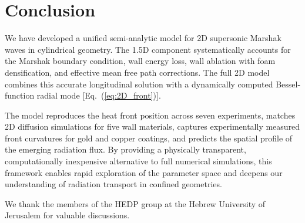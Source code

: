 \documentclass[prl, twocolumn, superscriptaddress, amsmath, amssymb, reprint]{revtex4-2}
\begin{document}
\section{Conclusion}

We have developed a unified semi-analytic model for 2D supersonic Marshak waves in cylindrical geometry.
The 1.5D component systematically accounts for the Marshak boundary condition, wall energy loss, wall ablation with foam densification, and effective mean free path corrections.
The full 2D model combines this accurate longitudinal solution with a dynamically computed Bessel-function radial mode [Eq.~(\ref{eq:2D_front})].

The model reproduces the heat front position across seven experiments, matches 2D diffusion simulations for five wall materials, captures experimentally measured front curvatures for gold and copper coatings, and predicts the spatial profile of the emerging radiation flux.
By providing a physically transparent, computationally inexpensive alternative to full numerical simulations, this framework enables rapid exploration of the parameter space and deepens our understanding of radiation transport in confined geometries.

\begin{acknowledgments}
We thank the members of the HEDP group at the Hebrew University of Jerusalem for valuable discussions.
\end{acknowledgments}
\end{document}
